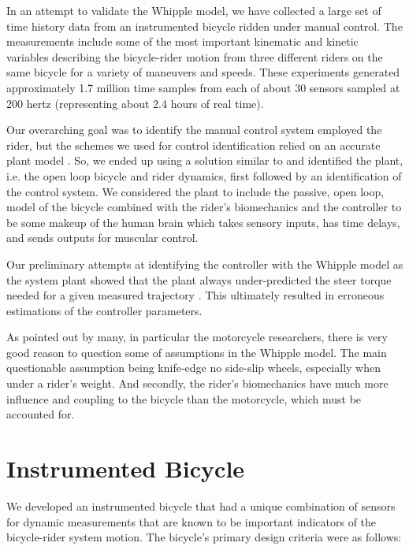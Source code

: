 \documentclass[a4paper]{article}
\begin{document}

In an attempt to validate the Whipple model, we have collected a large set of
time history data from an instrumented bicycle ridden under manual control. The
measurements include some of the most important kinematic and kinetic variables
describing the bicycle-rider motion from three different riders on the same
bicycle for a variety of maneuvers and speeds. These experiments generated
approximately 1.7 million time samples from each of about 30 sensors sampled at
200 hertz (representing about 2.4 hours of real time).

Our overarching goal was to identify the manual control system employed the
rider, but the schemes we used for control identification relied on an accurate
plant model \cite{Moore2012}. So, we ended up using a solution similar to
\cite{Eaton1973} and identified the plant, i.e. the open loop bicycle and rider
dynamics, first followed by an identification of the control system. We
considered the plant to include the passive, open loop, model of the bicycle
combined with the rider's biomechanics and the controller to be some makeup of
the human brain which takes sensory inputs, has time delays, and sends outputs
for muscular control.

Our preliminary attempts at identifying the controller with the Whipple model
as the system plant showed that the plant always under-predicted the steer
torque needed for a given measured trajectory \cite{Moore2012}. This ultimately
resulted in erroneous estimations of the controller parameters.

As pointed out by many, in particular the motorcycle researchers, there is very
good reason to question some of assumptions in the Whipple model. The main
questionable assumption being knife-edge no side-slip wheels, especially when
under a rider's weight. And secondly, the rider's biomechanics have much more
influence and coupling to the bicycle than the motorcycle, which must be
accounted for.

\section{Instrumented Bicycle}

We developed an instrumented bicycle that had a unique combination of sensors
for dynamic measurements that are known to be important indicators of the
bicycle-rider system motion. The bicycle's primary design criteria were as
follows:
\end{document}
